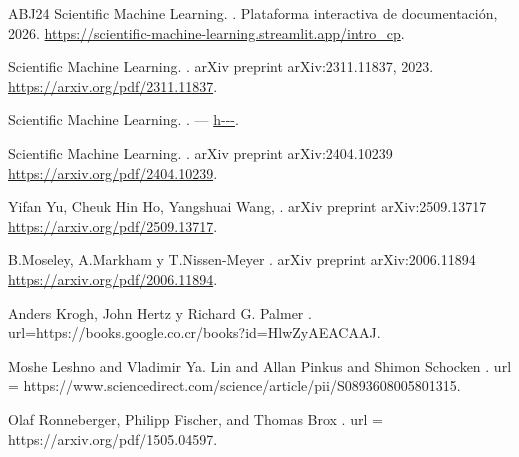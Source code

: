 \documentclass[12pt]{report}
\numberwithin{equation}{section}
\numberwithin{figure}{section}
\numberwithin{table}{section}
\theoremstyle{definition}
\begin{document}
\begin{flushleft}
\begin{thebibliography}{ABJ24}
Scientific Machine Learning.
.
\newblock Plataforma interactiva de documentación, 2026.
\newblock \url{https://scientific-machine-learning.streamlit.app/intro_cp}.


Scientific Machine Learning.
.
\newblock arXiv preprint arXiv:2311.11837, 2023.
\newblock \url{https://arxiv.org/pdf/2311.11837}.

Scientific Machine Learning.
.
\newblock ---
\newblock \url{h---}.


Scientific Machine Learning.
.
\newblock arXiv preprint arXiv:2404.10239
\newblock \url{https://arxiv.org/pdf/2404.10239}.

Yifan Yu, Cheuk Hin Ho, Yangshuai Wang,
.
\newblock arXiv preprint arXiv:2509.13717
\newblock \url{https://arxiv.org/pdf/2509.13717}.






B.Moseley, A.Markham y T.Nissen-Meyer
.
\newblock arXiv preprint arXiv:2006.11894
\newblock \url{https://arxiv.org/pdf/2006.11894}.



Anders Krogh, John Hertz y Richard G. Palmer
.
\newblock url={https://books.google.co.cr/books?id=HlwZyAEACAAJ}.


Moshe Leshno and Vladimir Ya. Lin and Allan Pinkus and Shimon Schocken
.
\newblock url = {https://www.sciencedirect.com/science/article/pii/S0893608005801315}.

Olaf Ronneberger, Philipp Fischer, and Thomas Brox
.
\newblock url = {https://arxiv.org/pdf/1505.04597}.




\end{thebibliography}
\end{flushleft}
\end{document}
